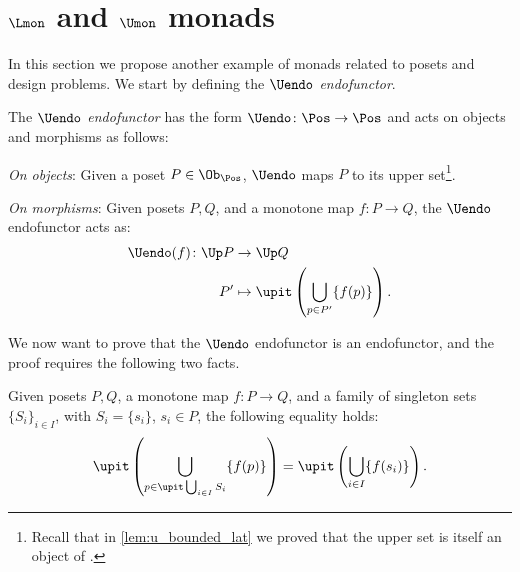 \section{$\Lmon$ and $\Umon$ monads}
In this section we propose another example of monads related to posets and design problems. We start by defining the \emph{$\Uendo$ endofunctor}.
\begin{definition}
  \label{def:Uendo}
  The \emph{$\Uendo$ endofunctor} has the form $\Uendo \colon \Pos \to \Pos$ and acts on objects and morphisms as follows:
  \begin{compactenum}
    \item \emph{On objects}: Given a poset $P\in \Ob_\Pos$, $\Uendo$ maps $P$ to its upper set\footnote{Recall that in \cref{lem:u_bounded_lat} we proved that the upper set is itself an object of \Pos.}.
    \item \emph{On morphisms}: Given posets $P,Q$, and a monotone map $f\colon P\to Q$, the $\Uendo$ endofunctor acts as:
    \begin{equation}
      \begin{aligned}
        \Uendo(f)\colon \Up P&\to \Up Q\\
        P'&\mapsto \upit \left( \bigcup_{p\in P'} \{f(p)\}\right).
      \end{aligned}
    \end{equation}
  \end{compactenum}
\end{definition}
We now want to prove that the $\Uendo$ endofunctor is an endofunctor, and the proof requires the following two facts.
\begin{lemma}
  \label{lem:unpack_u_functor}
  Given posets $P,Q$, a monotone map $f\colon P \to Q$, and a family of singleton sets $\{S_i\}_{i\in I}$, with $S_i=\{s_i\}$, $s_i\in P$, the following equality holds:
  \begin{equation}
    \label{eq:lemma_unpack}
    \upit\left( \bigcup_{p\in \upit \bigcup_{i\in I}S_i}\{f(p)\}\right)= \upit \left( \bigcup_{i\in I} \{f(s_i)\}\right).
  \end{equation}
\end{lemma}
